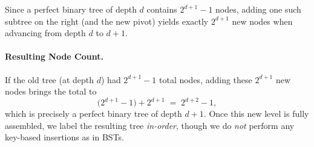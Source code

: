 \documentclass[acmsmall]{acmart}
\theoremstyle{definition}
\theoremstyle{remark}
\begin{document}
Since a perfect binary tree of depth $d$ contains $2^{d+1}-1$ nodes, 
adding one such subtree on the right (and the new pivot) yields exactly $2^{d+1}$ new nodes 
when advancing from depth $d$ to $d+1$. 

\paragraph{Resulting Node Count.}
If the old tree (at depth $d$) had $2^{d+1}-1$ total nodes, adding these $2^{d+1}$ new nodes 
brings the total to
\[
  \bigl(2^{d+1}-1\bigr) + 2^{d+1} 
  \;=\;
  2^{d+2}-1,
\]
which is precisely a perfect binary tree of depth $d+1$. Once this new level is fully assembled,
we label the resulting tree \emph{in-order}, though we do \emph{not} perform any 
key-based insertions as in BSTs.
\end{document}
